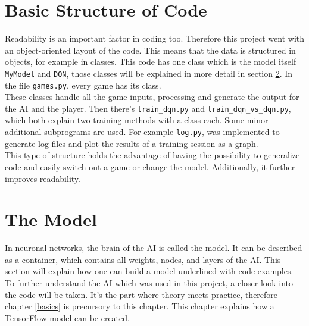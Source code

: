 \documentclass[12pt]{article}
\begin{document}
\section{Basic Structure of Code}
Readability is an important factor in coding too. Therefore this project went with an object-oriented layout of the code. This means that the data is structured in objects, for example in classes. This code has one class which is the model itself \lstinline{MyModel} and \lstinline{DQN}, those classes will be explained in more detail in section \ref{sec:TheModel}. In the file \lstinline{games.py}, every game has its class. \\
These classes handle all the game \glspl{input}, processing and generate the \gls{output} for the \gls{AI} and the player. Then there's \lstinline{train_dqn.py} and \lstinline{train_dqn_vs_dqn.py}, which both explain two training methods with a class each. Some minor additional subprograms are used. For example \lstinline{log.py}, was implemented to generate log files and plot the results of a training session as a graph. \\
This type of structure holds the advantage of having the possibility to generalize code and easily switch out a game or change the model. Additionally, it further improves readability.

\section{The Model}\label{sec:TheModel}
In \glspl{neuronal network}, the brain of the AI is called the model. It can be described as a container, which contains all weights, nodes, and layers of the AI. This section will explain how one can build a model underlined with code examples. To further understand the AI which was used in this project, a closer look into the code will be taken. It's the part where theory meets practice, therefore chapter \ref{basics} is precursory to this chapter. This chapter explains how a TensorFlow model can be created.
\end{document}

